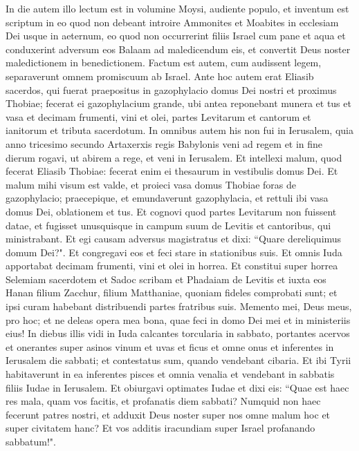 \begin{biblechapter}  
\verse In die autem illo lectum est in volumine Moysi, audiente populo, et inventum est scriptum in eo quod non debeant introire Ammonites et Moabites in ecclesiam Dei usque in aeternum, 
\verse eo quod non occurrerint filiis Israel cum pane et aqua et conduxerint adversum eos Balaam ad maledicendum eis, et convertit Deus noster maledictionem in benedictionem. 
\verse Factum est autem, cum audissent legem, separaverunt omnem promiscuum ab Israel. 
\verse Ante hoc autem erat Eliasib sacerdos, qui fuerat praepositus in gazophylacio domus Dei nostri et proximus Thobiae; 
\verse fecerat ei gazophylacium grande, ubi antea reponebant munera et tus et vasa et decimam frumenti, vini et olei, partes Levitarum et cantorum et ianitorum et tributa sacerdotum. 
\verse In omnibus autem his non fui in Ierusalem, quia anno tricesimo secundo Artaxerxis regis Babylonis veni ad regem et in fine dierum rogavi, ut abirem a rege, 
\verse et veni in Ierusalem. Et intellexi malum, quod fecerat Eliasib Thobiae: fecerat enim ei thesaurum in vestibulis domus Dei. 
\verse Et malum mihi visum est valde, et proieci vasa domus Thobiae foras de gazophylacio; 
\verse praecepique, et emundaverunt gazophylacia, et rettuli ibi vasa domus Dei, oblationem et tus. 
\verse Et cognovi quod partes Levitarum non fuissent datae, et fugisset unusquisque in campum suum de Levitis et cantoribus, qui ministrabant. 
\verse Et egi causam adversus magistratus et dixi: “Quare dereliquimus domum Dei?". Et congregavi eos et feci stare in stationibus suis. 
\verse Et omnis Iuda apportabat decimam frumenti, vini et olei in horrea. 
\verse Et constitui super horrea Selemiam sacerdotem et Sadoc scribam et Phadaiam de Levitis et iuxta eos Hanan filium Zacchur, filium Matthaniae, quoniam fideles comprobati sunt; et ipsi curam habebant distribuendi partes fratribus suis. 
\verse Memento mei, Deus meus, pro hoc; et ne deleas opera mea bona, quae feci in domo Dei mei et in ministeriis eius! 
\verse In diebus illis vidi in Iuda calcantes torcularia in sabbato, portantes acervos et onerantes super asinos vinum et uvas et ficus et omne onus et inferentes in Ierusalem die sabbati; et contestatus sum, quando vendebant cibaria. 
\verse Et ibi Tyrii habitaverunt in ea inferentes pisces et omnia venalia et vendebant in sabbatis filiis Iudae in Ierusalem. 
\verse Et obiurgavi optimates Iudae et dixi eis: “Quae est haec res mala, quam vos facitis, et profanatis diem sabbati? 
\verse Numquid non haec fecerunt patres nostri, et adduxit Deus noster super nos omne malum hoc et super civitatem hanc? Et vos additis iracundiam super Israel profanando sabbatum!". 

\end{biblechapter}
